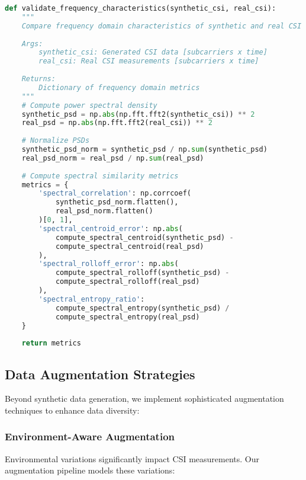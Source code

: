 \documentclass[journal]{IEEEtran}
\begin{document}
\begin{lstlisting}[language=Python, caption=Frequency Domain Validation]
def validate_frequency_characteristics(synthetic_csi, real_csi):
    """
    Compare frequency domain characteristics of synthetic and real CSI
    
    Args:
        synthetic_csi: Generated CSI data [subcarriers x time]
        real_csi: Real CSI measurements [subcarriers x time]
    
    Returns:
        Dictionary of frequency domain metrics
    """
    # Compute power spectral density
    synthetic_psd = np.abs(np.fft.fft2(synthetic_csi)) ** 2
    real_psd = np.abs(np.fft.fft2(real_csi)) ** 2
    
    # Normalize PSDs
    synthetic_psd_norm = synthetic_psd / np.sum(synthetic_psd)
    real_psd_norm = real_psd / np.sum(real_psd)
    
    # Compute spectral similarity metrics
    metrics = {
        'spectral_correlation': np.corrcoef(
            synthetic_psd_norm.flatten(), 
            real_psd_norm.flatten()
        )[0, 1],
        'spectral_centroid_error': np.abs(
            compute_spectral_centroid(synthetic_psd) - 
            compute_spectral_centroid(real_psd)
        ),
        'spectral_rolloff_error': np.abs(
            compute_spectral_rolloff(synthetic_psd) - 
            compute_spectral_rolloff(real_psd)
        ),
        'spectral_entropy_ratio': 
            compute_spectral_entropy(synthetic_psd) / 
            compute_spectral_entropy(real_psd)
    }
    
    return metrics
\end{lstlisting}

\subsection{Data Augmentation Strategies}

Beyond synthetic data generation, we implement sophisticated augmentation techniques to enhance data diversity:

\subsubsection{Environment-Aware Augmentation}

Environmental variations significantly impact CSI measurements. Our augmentation pipeline models these variations:
\end{document}
